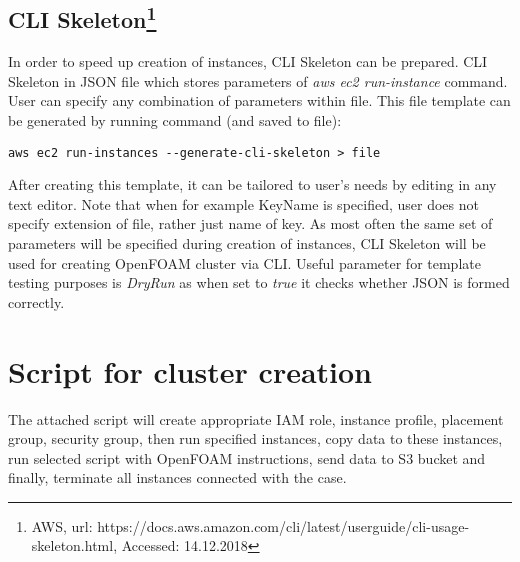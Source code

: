 \documentclass[12pt,english]{article}
\begin{document}
\subsection{CLI Skeleton\footnote{AWS, url: https://docs.aws.amazon.com/cli/latest/userguide/cli-usage-skeleton.html, Accessed: 14.12.2018}}

In order to speed up creation of instances, CLI Skeleton can be prepared. CLI Skeleton in JSON file which stores parameters of \textit{aws ec2 run-instance} command. User can specify any combination of parameters within file. This file template can be generated by running command (and saved to file):
\begin{lstlisting}
aws ec2 run-instances --generate-cli-skeleton > file
\end{lstlisting}
After creating this template, it can be tailored to user's needs by editing in any text editor. Note that when for example KeyName is specified, user does not specify extension of file, rather just name of key. As most often the same set of parameters will be specified during creation of instances, CLI Skeleton will be used for creating OpenFOAM cluster via CLI. Useful parameter for template testing purposes is \textit{DryRun} as when set to \textit{true} it checks whether JSON is formed correctly.

\section{Script for cluster creation}

The attached script will create appropriate IAM role, instance profile, placement group, security group, then run specified instances, copy data to these instances, run selected script with OpenFOAM instructions, send data to S3 bucket and finally, terminate all instances connected with the case.
\end{document}
